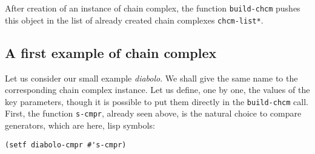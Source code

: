 After creation of an instance of chain complex, the function {\tt build-chcm} pushes this
object in the list of already created chain complexes {\tt *chcm-list*}.

\subsection* {A first example of chain complex}

Let us consider our small example {\em diabolo}. We shall give the same name to
the corresponding chain complex  instance.
Let us define, one by one, the values of the key parameters,
though it is possible to put them directly in the {\tt build-chcm} call.
First,  the function {\tt s-cmpr}, already seen above, is  the natural choice to compare
generators, which are here, lisp symbols:
{\footnotesize\begin{verbatim}
(setf diabolo-cmpr #'s-cmpr)
\end{verbatim}}


